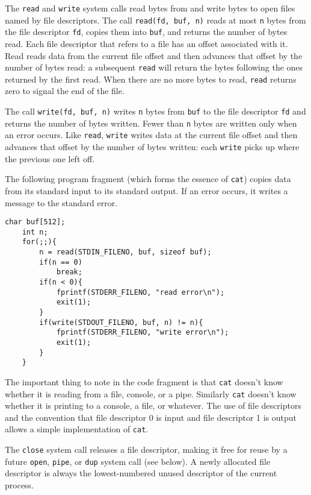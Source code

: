 \documentclass{report}
\begin{document}
	The \texttt{read} and \texttt{write} system calls read bytes from and write bytes to open files
	named by file descriptors. The call \texttt{read(fd, buf, n)} reads at most \texttt{n} bytes from the
	file descriptor \texttt{fd}, copies them into \texttt{buf}, and returns the number of bytes read. Each
	file descriptor that refers to a file has an offset associated with it. Read reads data
	from the current file offset and then advances that offset by the number of bytes read:
	a subsequent \texttt{read} will return the bytes following the ones returned by the first read.
	When there are no more bytes to read, \texttt{read} returns zero to signal the end of the file. 
	
	The call \texttt{write(fd, buf, n)} writes \texttt{n} bytes from \texttt{buf} to the file 
	descriptor \texttt{fd} and
	returns the number of bytes written. Fewer than \texttt{n} bytes are written only when an 
	error occurs. Like \texttt{read}, \texttt{write} writes data at the current file offset and then advances
	that offset by the number of bytes written: each \texttt{write} picks up where the previous
	one left off.
	
	The following program fragment (which forms the essence of \texttt{cat}) copies data
	from its standard input to its standard output. If an error occurs, it writes a message
	to the standard error.
	
	\begin{lstlisting}[style=c]
	char buf[512];
	int n;
	for(;;){
		n = read(STDIN_FILENO, buf, sizeof buf);
		if(n == 0)
			break;
		if(n < 0){
			fprintf(STDERR_FILENO, "read error\n");
			exit(1);
		}
		if(write(STDOUT_FILENO, buf, n) != n){
			fprintf(STDERR_FILENO, "write error\n");
			exit(1);
		}
	}
	\end{lstlisting}
	
	The important thing to note in the code fragment is that \texttt{cat} doesn't know whether it
	is reading from a file, console, or a pipe. Similarly \texttt{cat} doesn't know whether it is
	printing to a console, a file, or whatever. The use of file descriptors and the convention that 
	file descriptor 0 is input and file descriptor 1 is output allows a simple implementation of 
	\texttt{cat}.
	
	The \texttt{close} system call releases a file descriptor, making it free for reuse by a future 
	\texttt{open}, \texttt{pipe}, or \texttt{dup} system call (see below). A newly allocated file 
	descriptor is always the lowest-numbered unused descriptor of the current process.
	
\end{document}
